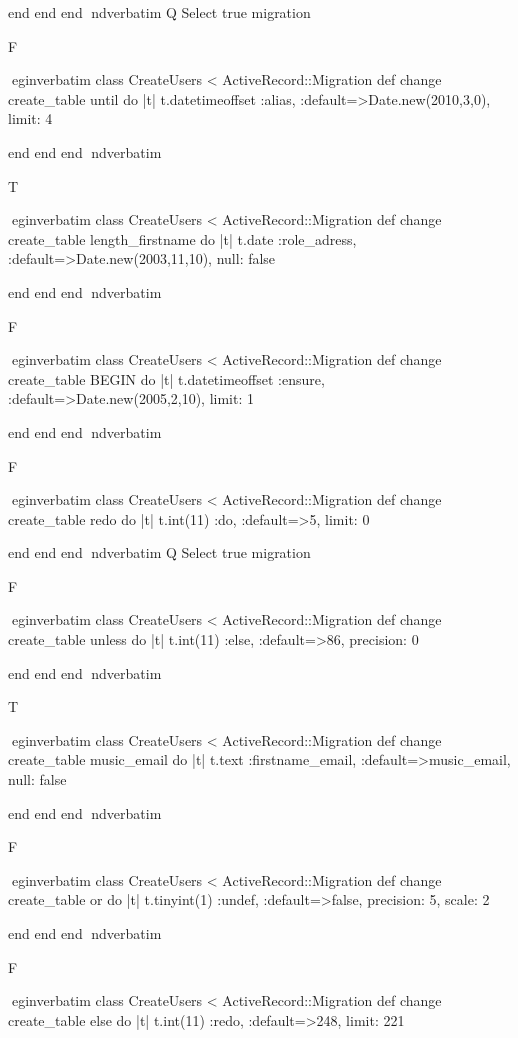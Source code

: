     end 
  end 
end
nd{verbatim}
Q
 Select true migration

F

egin{verbatim}
 class CreateUsers < ActiveRecord::Migration 
  def change 
    create_table until do |t| 
      t.datetimeoffset :alias, :default=>Date.new(2010,3,0), limit: 4
    
    end 
  end 
end
nd{verbatim}

T

egin{verbatim}
 class CreateUsers < ActiveRecord::Migration 
  def change 
    create_table length_firstname do |t| 
      t.date :role_adress, :default=>Date.new(2003,11,10), null: false
    
    end 
  end 
end
nd{verbatim}

F

egin{verbatim}
 class CreateUsers < ActiveRecord::Migration 
  def change 
    create_table BEGIN do |t| 
      t.datetimeoffset :ensure, :default=>Date.new(2005,2,10), limit: 1
    
    end 
  end 
end
nd{verbatim}

F

egin{verbatim}
 class CreateUsers < ActiveRecord::Migration 
  def change 
    create_table redo do |t| 
      t.int(11) :do, :default=>5, limit: 0
    
    end 
  end 
end
nd{verbatim}
Q
 Select true migration

F

egin{verbatim}
 class CreateUsers < ActiveRecord::Migration 
  def change 
    create_table unless do |t| 
      t.int(11) :else, :default=>86, precision: 0
    
    end 
  end 
end
nd{verbatim}

T

egin{verbatim}
 class CreateUsers < ActiveRecord::Migration 
  def change 
    create_table music_email do |t| 
      t.text :firstname_email, :default=>music_email, null: false
    
    end 
  end 
end
nd{verbatim}

F

egin{verbatim}
 class CreateUsers < ActiveRecord::Migration 
  def change 
    create_table or do |t| 
      t.tinyint(1) :undef, :default=>false, precision: 5, scale: 2
    
    end 
  end 
end
nd{verbatim}

F

egin{verbatim}
 class CreateUsers < ActiveRecord::Migration 
  def change 
    create_table else do |t| 
      t.int(11) :redo, :default=>248, limit: 221
    
